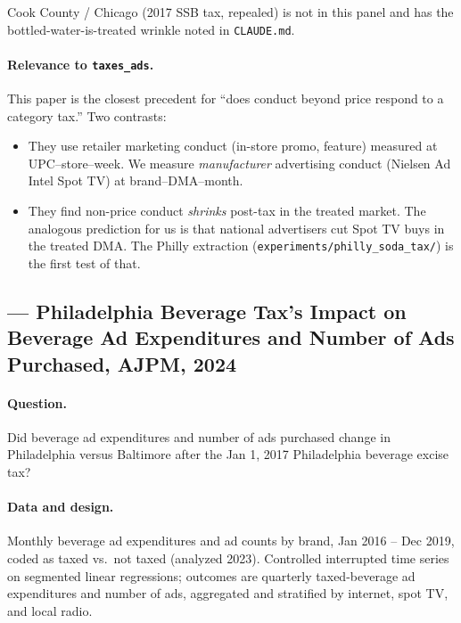 Cook County / Chicago (2017 SSB tax, repealed) is not in this
panel and has the bottled-water-is-treated wrinkle noted in
\texttt{CLAUDE.md}.

\paragraph{Relevance to \texttt{taxes\_ads}.}
This paper is the closest precedent for ``does conduct beyond
price respond to a category tax.'' Two contrasts:
\begin{itemize}
  \item They use retailer marketing conduct (in-store promo,
        feature) measured at UPC--store--week. We measure
        \emph{manufacturer} advertising conduct (Nielsen Ad
        Intel Spot TV) at brand--DMA--month.
  \item They find non-price conduct \emph{shrinks} post-tax in
        the treated market. The analogous prediction for us is
        that national advertisers cut Spot TV buys in the
        treated DMA. The Philly extraction
        (\texttt{experiments/philly\_soda\_tax/}) is the first
        test of that.
\end{itemize}

\subsection*{\citet{hua_philly_beverage_ad_expenditures}
  --- Philadelphia Beverage Tax's Impact on Beverage Ad
  Expenditures and Number of Ads Purchased, AJPM, 2024}

\paragraph{Question.} Did beverage ad expenditures and number
of ads purchased change in Philadelphia versus Baltimore after
the Jan 1, 2017 Philadelphia beverage excise tax?

\paragraph{Data and design.} Monthly beverage ad expenditures
and ad counts by brand, Jan 2016 -- Dec 2019, coded as taxed
vs.\ not taxed (analyzed 2023). Controlled interrupted time
series on segmented linear regressions; outcomes are quarterly
taxed-beverage ad expenditures and number of ads, aggregated
and stratified by internet, spot TV, and local radio.

